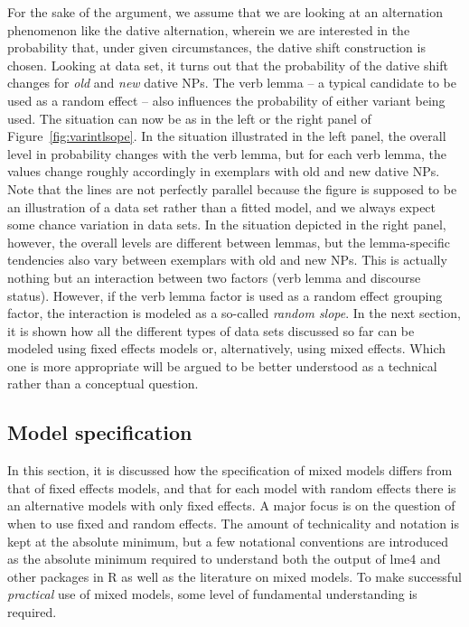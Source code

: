 \documentclass[a4paper,12pt]{article}
\begin{document}
For the sake of the argument, we assume that we are looking at an alternation phenomenon like the dative alternation, wherein we are interested in the probability that, under given circumstances, the dative shift construction is chosen.
Looking at data set, it turns out that the probability of the dative shift changes for \textit{old} and \textit{new} dative NPs.
The verb lemma -- a typical candidate to be used as a random effect -- also influences the probability of either variant being used.
The situation can now be as in the left or the right panel of Figure~\ref{fig:varintlsope}.
In the situation illustrated in the left panel, the overall level in probability changes with the verb lemma, but for each verb lemma, the values change roughly accordingly in exemplars with old and new dative NPs.
Note that the lines are not perfectly parallel because the figure is supposed to be an illustration of a data set rather than a fitted model, and we always expect some chance variation in data sets.
In the situation depicted in the right panel, however, the overall levels are different between lemmas, but the lemma-specific tendencies also vary between exemplars with old and new NPs.
This is actually nothing but an interaction between two factors (verb lemma and discourse status).
However, if the verb lemma factor is used as a random effect grouping factor, the interaction is modeled as a so-called \textit{random slope}.
In the next section, it is shown how all the different types of data sets discussed so far can be modeled using fixed effects models or, alternatively, using mixed effects.
Which one is more appropriate will be argued to be better understood as a technical rather than a conceptual question.

\subsection{Model specification}
\label{sec:modelspecification}

In this section, it is discussed how the specification of mixed models differs from that of fixed effects models, and that for each model with random effects there is an alternative models with only fixed effects.
A major focus is on the question of when to use fixed and random effects.
The amount of technicality and notation is kept at the absolute minimum, but a few notational conventions are introduced as the absolute minimum required to understand both the output of lme4 and other packages in R as well as the literature on mixed models.
To make successful \textit{practical} use of mixed models, some level of fundamental understanding is required.
\end{document}

